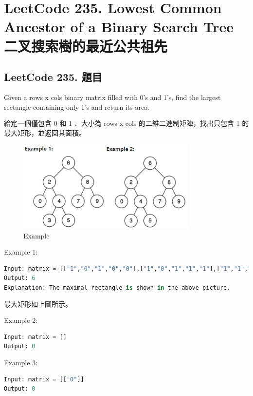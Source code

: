 \documentclass[10pt,UTF8]{ctexart}
\begin{document}
\newpage

\section{LeetCode 235. Lowest Common Ancestor of a Binary Search Tree 二叉搜索樹的最近公共祖先}

\subsection{LeetCode 235. 題目}

Given a rows x cols binary matrix filled with 0's and 1's, find the largest rectangle containing only 1's and return its area.

給定一個僅包含 0 和 1 、大小為 rows x cols 的二維二進制矩陣，找出只包含 1 的最大矩形，並返回其面積。

\begin{figure}[H]
\centering 
\includegraphics[width=0.80\textwidth]{lc-235-p-example.png} 
\caption{Example}
\label{Test}
\end{figure}

Example 1:

\begin{lstlisting}[language={python}]
Input: matrix = [["1","0","1","0","0"],["1","0","1","1","1"],["1","1","1","1","1"],["1","0","0","1","0"]]
Output: 6
Explanation: The maximal rectangle is shown in the above picture.
\end{lstlisting}

最大矩形如上圖所示。

Example 2:

\begin{lstlisting}[language={python}]
Input: matrix = []
Output: 0
\end{lstlisting}

Example 3:

\begin{lstlisting}[language={python}]
Input: matrix = [["0"]]
Output: 0
\end{lstlisting}
\end{document}
